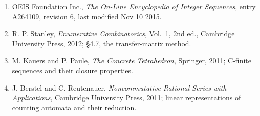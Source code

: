 \documentclass[11pt]{article}
\theoremstyle{definition}
\begin{document}
\begin{enumerate}

\item OEIS Foundation Inc., \emph{The On-Line Encyclopedia of Integer Sequences}, entry \href{https://oeis.org/A264109}{A264109}, revision 6, last modified Nov 10 2015.

\item R. P. Stanley, \emph{Enumerative Combinatorics}, Vol.~1, 2nd ed., Cambridge University Press, 2012; \S4.7, the transfer-matrix method.

\item M. Kauers and P. Paule, \emph{The Concrete Tetrahedron}, Springer, 2011; C-finite sequences and their closure properties.

\item J. Berstel and C. Reutenauer, \emph{Noncommutative Rational Series with Applications}, Cambridge University Press, 2011; linear representations of counting automata and their reduction.

\end{enumerate}
\end{document}

